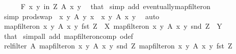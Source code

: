 \begin{isabellebody}
\ \ \ \ \isamarkupfalse%
\ {\isachardoublequoteopen}{\isasymforall}\isactrlsub F\ {\isacharparenleft}{\kern0pt}x{\isacharcomma}{\kern0pt}\ y{\isacharparenright}{\kern0pt}\ in\ {\isacharquery}{\kern0pt}Z{\isachardot}{\kern0pt}\ A\ x\ y{\isachardoublequoteclose}\ \isamarkupfalse%
\ that\ \isamarkupfalse%
{\isacharparenleft}{\kern0pt}simp\ add{\isacharcolon}{\kern0pt}\ eventually{\isacharunderscore}{\kern0pt}map{\isacharunderscore}{\kern0pt}filter{\isacharunderscore}{\kern0pt}on{\isacharparenright}{\kern0pt}\isanewline
\ \ \ \ \isamarkupfalse%
\ {\isacharbrackleft}{\kern0pt}simp{\isacharbrackright}{\kern0pt}{\isacharcolon}{\kern0pt}\ {\isachardoublequoteopen}prod{\isachardot}{\kern0pt}swap\ {\isacharbackquote}{\kern0pt}\ {\isacharbraceleft}{\kern0pt}{\isacharparenleft}{\kern0pt}x{\isacharcomma}{\kern0pt}\ y{\isacharparenright}{\kern0pt}{\isachardot}{\kern0pt}\ A\ y\ x{\isacharbraceright}{\kern0pt}\ {\isasymsubseteq}\ {\isacharbraceleft}{\kern0pt}{\isacharparenleft}{\kern0pt}x{\isacharcomma}{\kern0pt}\ y{\isacharparenright}{\kern0pt}{\isachardot}{\kern0pt}\ A\ x\ y{\isacharbraceright}{\kern0pt}{\isachardoublequoteclose}\ \isamarkupfalse%
\ auto\isanewline
\ \ \ \ \isamarkupfalse%
\ {\isachardoublequoteopen}map{\isacharunderscore}{\kern0pt}filter{\isacharunderscore}{\kern0pt}on\ {\isacharbraceleft}{\kern0pt}{\isacharparenleft}{\kern0pt}x{\isacharcomma}{\kern0pt}\ y{\isacharparenright}{\kern0pt}{\isachardot}{\kern0pt}\ A\ x\ y{\isacharbraceright}{\kern0pt}\ fst\ {\isacharquery}{\kern0pt}Z\ {\isacharequal}{\kern0pt}\ {\isacharquery}{\kern0pt}X{\isachardoublequoteclose}\ {\isachardoublequoteopen}map{\isacharunderscore}{\kern0pt}filter{\isacharunderscore}{\kern0pt}on\ {\isacharbraceleft}{\kern0pt}{\isacharparenleft}{\kern0pt}x{\isacharcomma}{\kern0pt}\ y{\isacharparenright}{\kern0pt}{\isachardot}{\kern0pt}\ A\ x\ y{\isacharbraceright}{\kern0pt}\ snd\ {\isacharquery}{\kern0pt}Z\ {\isacharequal}{\kern0pt}\ {\isacharquery}{\kern0pt}Y{\isachardoublequoteclose}\isanewline
\ \ \ \ \ \ \isamarkupfalse%
\ that\ \isamarkupfalse%
{\isacharparenleft}{\kern0pt}simp{\isacharunderscore}{\kern0pt}all\ add{\isacharcolon}{\kern0pt}\ map{\isacharunderscore}{\kern0pt}filter{\isacharunderscore}{\kern0pt}on{\isacharunderscore}{\kern0pt}comp\ o{\isacharunderscore}{\kern0pt}def{\isacharparenright}{\kern0pt}\isanewline
\ \ \isamarkupfalse%
\isanewline
\ \ \isamarkupfalse%
\ {\isachardoublequoteopen}rel{\isacharunderscore}{\kern0pt}filter\ A{\isasyminverse}{\isasyminverse}\ {\isacharparenleft}{\kern0pt}map{\isacharunderscore}{\kern0pt}filter{\isacharunderscore}{\kern0pt}on\ {\isacharbraceleft}{\kern0pt}{\isacharparenleft}{\kern0pt}x{\isacharcomma}{\kern0pt}\ y{\isacharparenright}{\kern0pt}{\isachardot}{\kern0pt}\ A\ x\ y{\isacharbraceright}{\kern0pt}\ snd\ Z{\isacharparenright}{\kern0pt}\ {\isacharparenleft}{\kern0pt}map{\isacharunderscore}{\kern0pt}filter{\isacharunderscore}{\kern0pt}on\ {\isacharbraceleft}{\kern0pt}{\isacharparenleft}{\kern0pt}x{\isacharcomma}{\kern0pt}\ y{\isacharparenright}{\kern0pt}{\isachardot}{\kern0pt}\ A\ x\ y{\isacharbraceright}{\kern0pt}\ fst\ Z{\isacharparenright}{\kern0pt}{\isachardoublequoteclose}\isanewline

\end{isabellebody}
